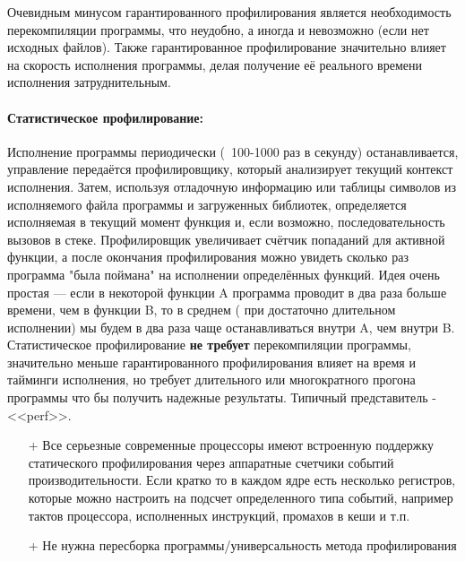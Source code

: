 \documentclass[12pt]{article}
\begin{document}
Очевидным минусом гарантированного профилирования является необходимость перекомпиляции программы, что неудобно, а иногда и невозможно (если нет исходных файлов). Также гарантированное профилирование значительно влияет на скорость исполнения программы, делая получение её реального времени исполнения затруднительным.


\paragraph*{Статистическое профилирование:}  Исполнение программы периодически (~100-1000 раз в секунду) останавливается, управление передаётся профилировщику, который анализирует текущий контекст исполнения. Затем, используя отладочную информацию или таблицы символов из исполняемого файла программы и загруженных библиотек, определяется исполняемая в текущий момент функция и, если возможно, последовательность вызовов в стеке. Профилировщик увеличивает счётчик попаданий для активной функции, а после окончания профилирования можно увидеть сколько раз программа "была поймана" на исполнении определённых функций. Идея очень простая --- если в некоторой функции A программа проводит в два раза больше времени, чем в функции B, то в среднем ( при достаточно длительном исполнении) мы будем в два раза чаще останавливаться внутри A, чем внутри B. Статистическое профилирование {\bf не требует} перекомпиляции программы, значительно меньше гарантированного профилирования влияет на время и тайминги исполнения, но требует длительного или многократного прогона программы что бы получить надежные результаты. Типичный представитель - <<perf>>. 
\begin{itemize}
\item[+] 	Все серьезные современные процессоры имеют встроенную поддержку статического профилирования через аппаратные счетчики событий производительности. Если кратко то в каждом ядре есть несколько регистров, которые можно настроить на подсчет определенного типа событий, например тактов процессора, исполненных инструкций, промахов в кеши и т.п.
\item[+] Не нужна пересборка программы/универсальность метода профилирования
\end{itemize}

\end{document}
